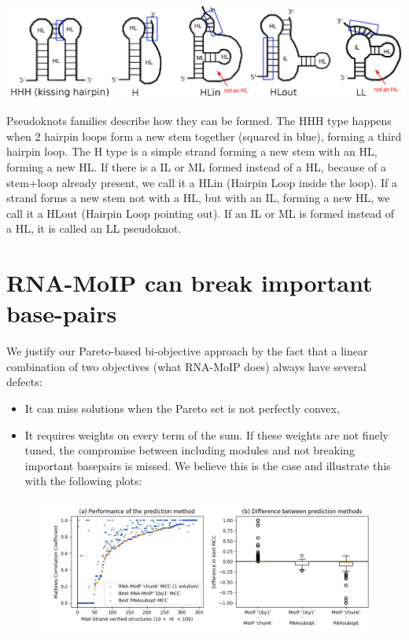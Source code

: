 \documentclass{article}
\begin{document}
\begin{center}
    \includegraphics[width=0.8\linewidth]{fig/pseudoknots.png}
\end{center}
Pseudoknots families describe how they can be formed. The HHH type happens when 2 hairpin loops form a new stem together (squared in blue), forming a third hairpin loop. The H type is a simple strand forming a new stem with an HL, forming a new HL. If there is a IL or ML formed instead of a HL, because of a stem+loop already present, we call it a HLin (Hairpin Loop inside the loop). If a strand forms a new stem not with a HL, but with an IL, forming a new HL, we call it a HLout (Hairpin Loop pointing out). If an IL or ML is formed instead of a HL, it is called an LL pseudoknot.

\newpage

\section{RNA-MoIP can break important base-pairs}
We justify our Pareto-based bi-objective approach by the fact that a linear combination of two objectives (what RNA-MoIP does) always have several defects:
\begin{itemize}
    \item It can miss solutions when the Pareto set is not perfectly convex,
    \item It requires weights on every term of the sum. If these weights are not finely tuned, the compromise between including modules and not breaking important basepairs is missed. We believe this is the case and illustrate this with the following plots:
\end{itemize}

\begin{figure}[h]
\includegraphics[width=\linewidth]{fig/MOIP_subopt.jpg}
\end{figure}
\end{document}
